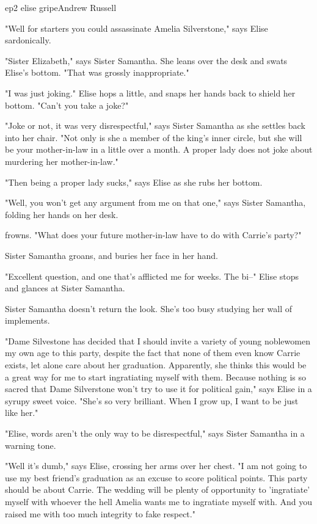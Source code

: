 \documentclass{book}
\begin{document}
\begin{childnode}{ep2 elise gripe}{Andrew Russell}

    "Well for starters you could assassinate Amelia Silverstone," says Elise sardonically.

    "Sister Elizabeth," says Sister Samantha. She leans over the desk and swats Elise's bottom. "That was grossly inappropriate."

    "I was just joking." Elise hops a little, and snaps her hands back to shield her bottom. "Can't you take a joke?"

    "Joke or not, it was very disrespectful," says Sister Samantha as she settles back into her chair. "Not only is she a member of the king's inner circle, but she will be your mother-in-law in a little over a month. A proper lady does not joke about murdering
    her mother-in-law."

    "Then being a proper lady sucks," says Elise as she rubs her bottom.

    "Well, you won't get any argument from me on that one," says Sister Samantha, folding her hands on her desk.

    \name{} frowns. "What does your future mother-in-law have to do with Carrie's party?"

    Sister Samantha groans, and buries her face in her hand.

    "Excellent question, and one that's afflicted me for weeks. The bi--" Elise stops and glances at Sister Samantha. 
    
    Sister Samantha doesn't return the look. She's too busy studying her wall of implements.

    "Dame Silvestone has decided that I should invite a variety of young noblewomen my own age to this party, despite the fact that none of them even know Carrie exists, let alone care about her graduation. Apparently, she thinks this
    would be a great way for me to start ingratiating myself with them. Because nothing is so sacred that Dame Silverstone won't try to use it for political gain," says Elise in a syrupy sweet voice. "She's so very brilliant. When I grow up, I want to be just like
    her."

    "Elise, words aren't the only way to be disrespectful," says Sister Samantha in a warning tone. 

    "Well it's dumb," says Elise, crossing her arms over her chest. "I am not going to use my best friend's graduation as an excuse to score political points. This party should be about Carrie. The wedding will be plenty of opportunity to 'ingratiate' myself with
    whoever the hell Amelia wants me to ingratiate myself with. And you raised me with too much integrity to fake respect."


\end{childnode}
\end{document}
